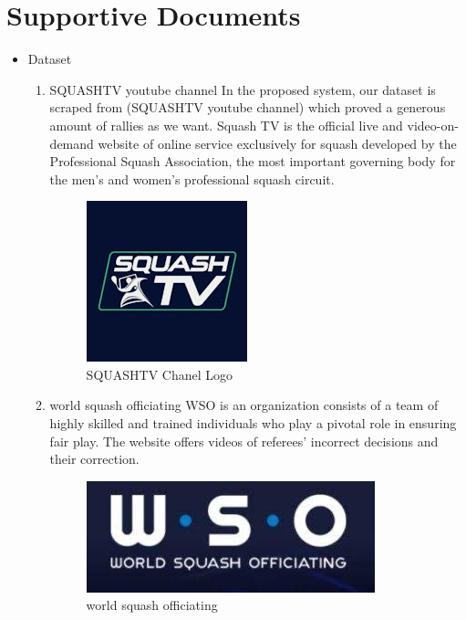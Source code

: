\documentclass[12pt]{article}
\begin{document}
\section{Supportive Documents}

\begin{itemize}
    \item Dataset
    \newline
        \begin{enumerate}
    
            \item SQUASHTV youtube channel
            \newline
            In the proposed system, our dataset is scraped from (SQUASHTV youtube channel) which proved a generous amount of rallies as we want. Squash TV is the official live and video-on-demand website of online service exclusively for squash developed by the Professional Squash Association, the most important governing body for the men's and women's professional squash circuit.
        \begin{figure}[H]
            \centering
            \includegraphics{figures/squashtv_logo.jpg}
            \caption{SQUASHTV Chanel Logo}
            \label{fig:squashtv}
        \end{figure}
        
            \item world squash officiating
            \newline
                WSO is an organization consists of a team of highly skilled and
                trained individuals who play a pivotal role in ensuring fair play.
                The website offers videos of referees' incorrect decisions and their correction.
                
                \begin{figure}[H]
                \centering
                \includegraphics[width=0.5\linewidth]{figures/wso.jpg}
                \caption{world squash officiating}
                \label{fig:world squash officiating}
                \end{figure}
        \end{enumerate}
    

\end{itemize}
\end{document}
